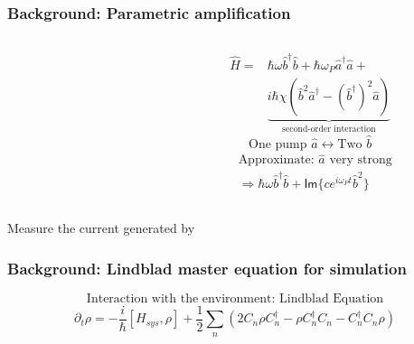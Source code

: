 \documentclass{beamer}
\begin{document}
\begin{frame}[c]
\frametitle{Background: Parametric amplification}
\begin{columns}
\begin{column}{0.5\textwidth}
\end{column}
\begin{column}{0.5\textwidth}
 \begin{align*}
    \hat{H}=&\hbar\omega \hat{b}^{\dag}\hat{b}+\hbar\omega_{P}\hat{a}^{\dag}\hat{a}+\\
            &\underbrace{i\hbar\chi(\hat{b}^{2}\hat{a}^{\dag}-(\hat{b}^{\dag})^{2}\hat{a})}_{\text{second-order interaction}}
  \end{align*}
  \[
    \text{One pump }\hat{a}\leftrightarrow\text{Two }\hat{b}
  \]
  \begin{align*}
    &\text{Approximate: }\hat{a}\text{ very strong}\\
    &\Rightarrow\hbar\omega\hat{b}^{\dag}\hat{b}+\mathsf{Im}\{ce^{i\omega_{P}t}\hat{b}^{2}\}
  \end{align*}
\end{column}
\end{columns}
Measure the current generated by
\end{frame}
\begin{frame}[c]
  \frametitle{Background: Lindblad master equation for simulation}
  \[
    \text{Interaction with the environment: Lindblad Equation}
  \]
  \[
    \partial_{t}\rho=-\frac{i}{\hbar}[H_{sys},\rho]+\frac{1}{2}\sum_{n}(2C_{n}\rho C_{n}^{\dag}-\rho C_{n}^{\dag}C_{n}-C_{n}^{\dag} C_{n}\rho)
  \]
\end{frame}
\end{document}
